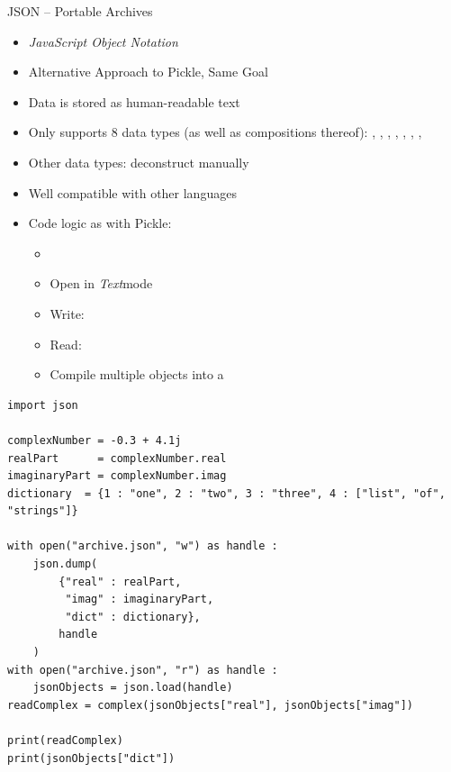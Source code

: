 \begin{frame}[fragile]{JSON -- Portable Archives}
%
\begin{itemize}
\item \emph{JavaScript Object Notation}
\item Alternative Approach to Pickle, Same Goal
\item Data is stored as human-readable text
\item Only supports 8 data types (as well as compositions thereof): 
	, , , , , , , 
\item Other data types: deconstruct manually
\item Well compatible with other languages
\item Code logic as with Pickle:
	\begin{itemize}
	\item {}
	\item Open in \emph{Text}mode
	\item Write: 
	\item Read: 
	\item Compile multiple objects into a 
	\end{itemize}
\end{itemize}
%
\end{frame}


\begin{frame}[fragile]
%
\begin{codebox}
\begin{verbatim}
import json

complexNumber = -0.3 + 4.1j
realPart      = complexNumber.real
imaginaryPart = complexNumber.imag
dictionary  = {1 : "one", 2 : "two", 3 : "three", 4 : ["list", "of", "strings"]}

with open("archive.json", "w") as handle :
    json.dump(
        {"real" : realPart,
         "imag" : imaginaryPart,
         "dict" : dictionary},
        handle
    )
with open("archive.json", "r") as handle :
    jsonObjects = json.load(handle)
readComplex = complex(jsonObjects["real"], jsonObjects["imag"])

print(readComplex)
print(jsonObjects["dict"])
\end{verbatim}
\end{codebox}
%
\end{frame}

